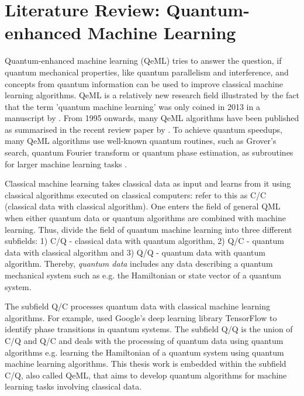 \chapter{Literature Review: Quantum-enhanced Machine Learning}\label{sec:qml}

Quantum-enhanced machine learning (QeML) tries to answer the question, if quantum mechanical properties, like quantum parallelism and interference, and concepts from quantum information can be used to improve classical machine learning algorithms. QeML is a relatively new research field illustrated by the fact that the term 'quantum machine learning' was only coined in 2013 in a manuscript by . From 1995 onwards, many QeML algorithms have been published as summarised in the recent review paper by . To achieve quantum speedups, many QeML algorithms use well-known quantum routines, such as Grover's search, quantum Fourier transform or quantum phase estimation, as subroutines for larger machine learning tasks \cite{aimeur2013quantum,anguita2003quantum,biamonte2016quantum,kapoor2016quantum,lloyd2013quantum}.

Classical machine learning takes classical data as input and learns from it using classical algorithms executed on classical computers:  refer to this as C/C (classical data with classical algorithm). One enters the field of general QML when either quantum data or quantum algorithms are combined with machine learning. Thus,  divide the field of quantum machine learning into three different subfields: 1) C/Q - classical data with quantum algorithm, 2) Q/C - quantum data with classical algorithm and 3) Q/Q - quantum data with quantum algorithm. Thereby, \emph{quantum data} includes any data describing a quantum mechanical system such as e.g. the Hamiltonian or state vector of a quantum system.

The subfield Q/C processes quantum data with classical machine learning algorithms. For example,  used Google's deep learning library TensorFlow to identify phase transitions in quantum systems. The subfield Q/Q is the union of C/Q and Q/C and deals with the processing of quantum data using quantum algorithms e.g. learning the Hamiltonian of a quantum system using quantum machine learning algorithms. This thesis work is embedded within the subfield C/Q, also called QeML, that aims to develop quantum algorithms for machine learning tasks involving classical data.

